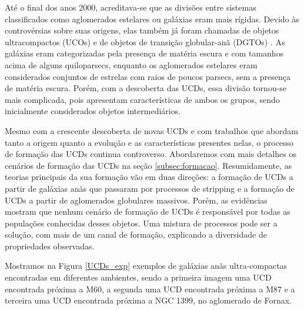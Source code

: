 Até o final dos anos 2000, acreditava-se que as divisões entre sistemas classificados como aglomerados estelares ou galáxias eram mais rígidas. Devido às controvérsias sobre suas origens, elas também já foram chamadas de objetos ultracompactos (UCOs) \citep{Mieske_2002} e de objetos de transição globular-anã (DGTOs) \citep{Hasegan_2005}. As galáxias eram categorizadas pela presença de matéria escura e com tamanhos acima de alguns quiloparsecs, enquanto os aglomerados estelares eram considerados conjuntos de estrelas com raios de poucos parsecs, sem a presença de matéria escura. Porém, com a descoberta das UCDs, essa divisão tornou-se mais complicada, pois apresentam características de ambos os grupos, sendo inicialmente considerados objetos intermediários.

Mesmo com a crescente descoberta de novas UCDs e com trabalhos que abordam tanto a origem quanto a evolução e as características presentes nelas, o processo de formação das UCDs continua controverso. Abordaremos com mais detalhes os cenários de formação das UCDs na seção \ref{subsec:formacao}. Resumidamente, as teorias principais da sua formação vão em duas direções: a formação de UCDs a partir de galáxias anãs que passaram por processos de stripping e a formação de UCDs a partir de aglomerados globulares massivos. Porém, as evidências mostram que nenhum cenário de formação de UCDs é responsável por todas as populações conhecidas desses objetos. Uma mistura de processos pode ser a solução, com mais de um canal de formação, explicando a diversidade de propriedades observadas.

Mostramos na Figura \ref{UCDs_exp} exemplos de galáxias anãs ultra-compactas encontradas em diferentes ambientes, sendo a primeira imagem uma UCD encontrada próxima a M60, a segunda uma UCD encontrada próxima a M87 e a terceira uma UCD encontrada próxima a NGC 1399, no aglomerado de Fornax.

